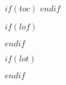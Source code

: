 

$if(toc)$
\renewcommand*\contentsname{Table des matieres}
\tableofcontents
$endif$

\newpage

$if(lof)$
\renewcommand\listfigurename{Liste des figures}
\listoffigures
$endif$

$if(lot)$
\renewcommand\listtablename{Liste des tableaux}
\listoftables
$endif$

\newpage

\setcounter{page}{1}
\renewcommand\tablename{Tableau}
\renewcommand\figurename{Figure}